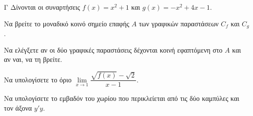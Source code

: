 \begin{thema}{Γ}
Δίνονται οι συναρτήσεις $f(x) = x^2 + 1$ και $g(x) = -x^2 + 4x - 1$.
\begin{erwthma}
  \item Να βρείτε το μοναδικό κοινό σημείο επαφής $A$ των γραφικών παραστάσεων $C_f$ και $C_g$.
  \item Να ελέγξετε αν οι δύο γραφικές παραστάσεις δέχονται κοινή εφαπτόμενη στο $A$ και αν ναι, να τη βρείτε.
  \item Να υπολογίσετε το όριο $\lim\limits_{x \to 1} \dfrac{\sqrt{f(x)} - \sqrt{2}}{x - 1}$.
  \item Να υπολογίσετε το εμβαδόν του χωρίου που περικλείεται από τις δύο καμπύλες και τον άξονα $y'y$.
\end{erwthma}
\end{thema}
